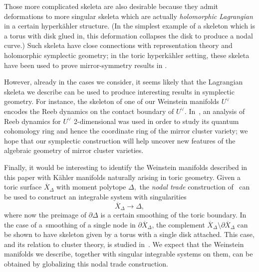 \documentclass[10pt,a4paper]{amsart}
\numberwithin{equation}{section}
\begin{document}
Those more complicated skeleta are also desirable because they admit deformations to more singular skeleta which are actually {\em holomorphic Lagrangian} in a certain hyperk\"ahler structure. (In the simplest example of a skeleton which is a torus with disk glued in, this deformation collapses the disk to produce a nodal curve.) Such skeleta have close connections with representation theory and holomorphic symplectic geometry; in the toric hyperk\"ahler setting, these skeleta have been used to prove mirror-symmetry results in \cite{GMW19,MW18}.

However, already in the cases we consider, it seems likely that the Lagrangian skeleta we describe can be used to produce interesting results in symplectic geometry. For instance, the skeleton of one of our Weinstein manifolds $U^\vee$ encodes the Reeb dynamics on the contact boundary of $U^\vee$. In~\cite{Pasc-SH}, an analysis of Reeb dynamics for $U^\vee$ 2-dimensional was used in order to study its quantum cohomology ring and hence the coordinate ring of the mirror cluster variety; we hope that our symplectic construction will help uncover new features of the algebraic geometry of mirror cluster varieties.

Finally, it would be interesting to identify the Weinstein manifolds described in this paper with K\"ahler manifolds naturally arising in toric geometry. Given a toric surface $\overline{X}_\Delta$ with moment polytope $\Delta,$ the \textit{nodal trade} construction of~\cite{Sym} can be used to construct an integrable system with singularities
\[
    \overline{X}_\Delta\to \Delta,
\]
where now the preimage of $\partial \Delta$ is a certain smoothing of the toric boundary. In the case of a~smoothing of a single node in $\partial \overline{X}_\Delta$, the complement $\overline{X}_\Delta\setminus \partial \overline{X}_\Delta$ can be shown to have skeleton given by a torus with a single disk attached. This case, and its relation to cluster theory, is studied in~\cite{PT}.
We expect that the Weinstein manifolds we describe, together with singular integrable systems on them, can be obtained by globalizing this nodal trade construction.
\end{document}
